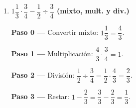 \documentclass[11pt, letterpaper]{article}
\begin{document}
\begin{tcolorbox}[examplebox, title={Ejemplos sin s\'imbolos de agrupaci\'on (dificultad progresiva)}]
\begin{enumerate}[label=\textbf{Ej. \arabic*.}, leftmargin=*, itemsep=18pt]
\textbf{Paso 2 ---} Sustituir: $\dfrac{3}{4} + \left(-\dfrac{3}{4}\right) - \left(-\dfrac{1}{6}\right) = \dfrac{3}{4} - \dfrac{3}{4} + \dfrac{1}{6} = 0 + \dfrac{1}{6} = \dfrac{1}{6}$.

\item \textbf{$1\dfrac{1}{3} \cdot \dfrac{3}{4} - \dfrac{1}{2} \div \dfrac{3}{4}$ \quad (mixto, mult. y div.)}

\textbf{Paso 0 ---} Convertir mixto: $1\dfrac{1}{3} = \dfrac{4}{3}$.

\textbf{Paso 1 ---} Multiplicaci\'on: $\dfrac{4}{3} \cdot \dfrac{3}{4} = 1$.

\textbf{Paso 2 ---} Divisi\'on: $\dfrac{1}{2} \div \dfrac{3}{4} = \dfrac{1}{2} \cdot \dfrac{4}{3} = \dfrac{2}{3}$.

\textbf{Paso 3 ---} Restar: $1 - \dfrac{2}{3} = \dfrac{3}{3} - \dfrac{2}{3} = \dfrac{1}{3}$.

\end{enumerate}
\end{tcolorbox}
\end{document}
